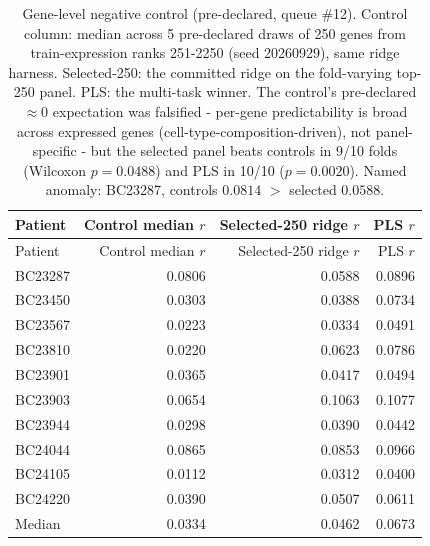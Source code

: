 \begin{longtable}{lrrr}
\caption{Gene-level negative control (pre-declared, queue \#12). Control column: median
across 5 pre-declared draws of 250 genes from train-expression ranks 251-2250 (seed 20260929),
same ridge harness. Selected-250: the committed ridge on the fold-varying top-250 panel. PLS:
the multi-task winner. The control's pre-declared $\approx 0$ expectation was falsified -
per-gene predictability is broad across expressed genes (cell-type-composition-driven), not
panel-specific - but the selected panel beats controls in 9/10 folds (Wilcoxon $p=0.0488$) and
PLS in 10/10 ($p=0.0020$). Named anomaly: BC23287, controls $0.0814$ $>$ selected $0.0588$.}\label{tab:gene-negcontrol}\\
\toprule
Patient & Control median $r$ & Selected-250 ridge $r$ & PLS $r$ \\
\midrule
\endfirsthead
\toprule
Patient & Control median $r$ & Selected-250 ridge $r$ & PLS $r$ \\
\midrule
\endhead
BC23287 & 0.0806 & 0.0588 & 0.0896 \\
BC23450 & 0.0303 & 0.0388 & 0.0734 \\
BC23567 & 0.0223 & 0.0334 & 0.0491 \\
BC23810 & 0.0220 & 0.0623 & 0.0786 \\
BC23901 & 0.0365 & 0.0417 & 0.0494 \\
BC23903 & 0.0654 & 0.1063 & 0.1077 \\
BC23944 & 0.0298 & 0.0390 & 0.0442 \\
BC24044 & 0.0865 & 0.0853 & 0.0966 \\
BC24105 & 0.0112 & 0.0312 & 0.0400 \\
BC24220 & 0.0390 & 0.0507 & 0.0611 \\
\midrule
Median & 0.0334 & 0.0462 & 0.0673 \\
\bottomrule
\end{longtable}
